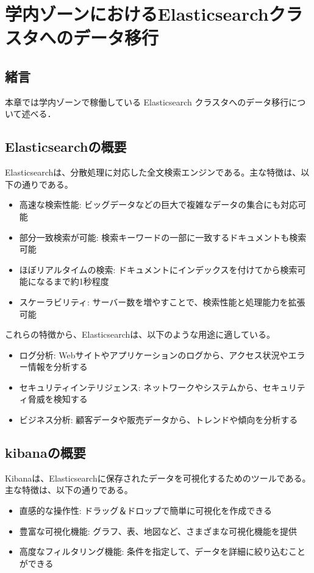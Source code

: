 
\chapter{学内ゾーンにおけるElasticsearchクラスタへのデータ移行}
\label{chap:second}

\section{緒言}
本章では学内ゾーンで稼働している Elasticsearch クラスタへのデータ移行について述べる．

\section{Elasticsearchの概要}
Elasticsearchは、分散処理に対応した全文検索エンジンである。主な特徴は、以下の通りである。

\begin{itemize}
    \item 高速な検索性能: ビッグデータなどの巨大で複雑なデータの集合にも対応可能
    \item 部分一致検索が可能: 検索キーワードの一部に一致するドキュメントも検索可能
    \item ほぼリアルタイムの検索: ドキュメントにインデックスを付けてから検索可能になるまで約1秒程度
    \item スケーラビリティ: サーバー数を増やすことで、検索性能と処理能力を拡張可能
\end{itemize}

これらの特徴から、Elasticsearchは、以下のような用途に適している。

\begin{itemize}
    \item ログ分析: Webサイトやアプリケーションのログから、アクセス状況やエラー情報を分析する
    \item セキュリティインテリジェンス: ネットワークやシステムから、セキュリティ脅威を検知する
    \item ビジネス分析: 顧客データや販売データから、トレンドや傾向を分析する
\end{itemize}

\section{kibanaの概要}

Kibanaは、Elasticsearchに保存されたデータを可視化するためのツールである。主な特徴は、以下の通りである。

\begin{itemize}
    \item 直感的な操作性: ドラッグ＆ドロップで簡単に可視化を作成できる
    \item 豊富な可視化機能: グラフ、表、地図など、さまざまな可視化機能を提供
    \item 高度なフィルタリング機能: 条件を指定して、データを詳細に絞り込むことができる
\end{itemize}


